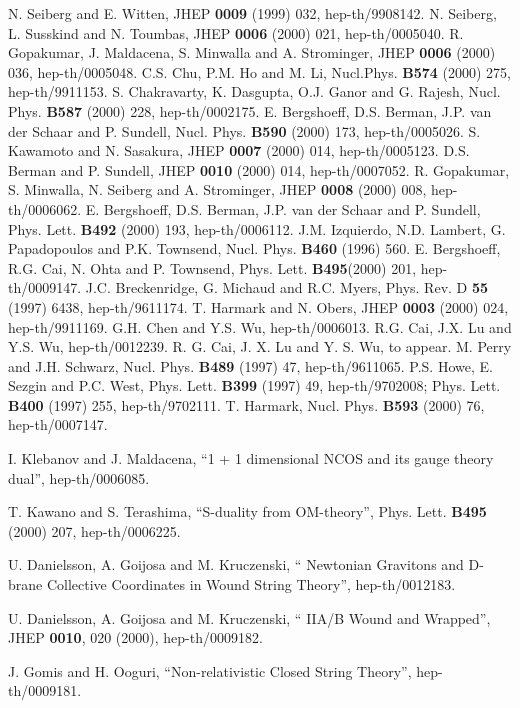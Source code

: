 \documentclass[a4paper,12pt]{article}
\begin{document}
\begin{thebibliography}{99}
N. Seiberg and E. Witten, JHEP {\bf 0009} (1999) 032,
  hep-th/9908142.
N. Seiberg, L. Susskind and N. Toumbas, JHEP {\bf 0006} (2000) 021, hep-th/0005040.
 R. Gopakumar, J. Maldacena, S. Minwalla and A. Strominger,
    JHEP {\bf 0006} (2000) 036,  hep-th/0005048.
C.S. Chu, P.M. Ho and M. Li, Nucl.Phys. {\bf B574} (2000) 275,
    hep-th/9911153.
S. Chakravarty, K. Dasgupta, O.J. Ganor and G. Rajesh,
        Nucl. Phys. {\bf B587} (2000) 228,  hep-th/0002175.
E. Bergshoeff, D.S. Berman, J.P. van der Schaar and P. Sundell,
       Nucl. Phys. {\bf B590} (2000) 173,  hep-th/0005026.
S. Kawamoto and N. Sasakura, JHEP {\bf 0007} (2000)
     014,  hep-th/0005123.
D.S. Berman and P. Sundell, JHEP {\bf 0010} (2000) 014,
    hep-th/0007052.
R. Gopakumar, S. Minwalla, N. Seiberg and A. Strominger,
         JHEP {\bf 0008} (2000) 008, hep-th/0006062.
 E. Bergshoeff, D.S. Berman, J.P. van der Schaar and P. Sundell,
     Phys. Lett. {\bf B492} (2000) 193,   hep-th/0006112.
 J.M. Izquierdo, N.D. Lambert, G. Papadopoulos and P.K.
  Townsend, Nucl. Phys. {\bf B460} (1996) 560. 
E. Bergshoeff, R.G. Cai, N. Ohta and P. Townsend, 
         Phys. Lett. {\bf B495}(2000) 201,  hep-th/0009147.
J.C. Breckenridge, G. Michaud and R.C. Myers, Phys. Rev. D
     {\bf 55} (1997) 6438, hep-th/9611174.
T. Harmark and N. Obers, JHEP {\bf 0003} (2000) 024,
    hep-th/9911169.
G.H. Chen and Y.S. Wu, hep-th/0006013.
 R.G. Cai, J.X. Lu and Y.S. Wu, hep-th/0012239.
 R. G. Cai, J. X. Lu and Y. S. Wu, to appear.
 M. Perry and J.H. Schwarz, Nucl. Phys. {\bf B489} (1997) 47,
    hep-th/9611065.
P.S. Howe, E. Sezgin and P.C. West, Phys. Lett. {\bf B399} 
    (1997) 49, hep-th/9702008; Phys. Lett. {\bf B400} (1997) 255, 
   hep-th/9702111.
T. Harmark, Nucl. Phys. {\bf B593} (2000) 76, hep-th/0007147.

 I. Klebanov and J. Maldacena, ``1 + 1 dimensional NCOS
and its \coordHE{} gauge theory dual'', hep-th/0006085.

 T. Kawano and S. Terashima, ``S-duality from OM-theory'',
Phys. Lett. {\bf B495} (2000) 207, hep-th/0006225.

 U. Danielsson, A. Goijosa and M. Kruczenski, ``
Newtonian Gravitons and D-brane Collective Coordinates in Wound 
String Theory'', hep-th/0012183.

  U. Danielsson, A. Goijosa and M. Kruczenski, ``
IIA/B Wound and Wrapped'', JHEP {\bf 0010}, 020 (2000), hep-th/0009182.

 J. Gomis and H. Ooguri, ``Non-relativistic Closed String
Theory'', hep-th/0009181.

\end{thebibliography}
\end{document}
